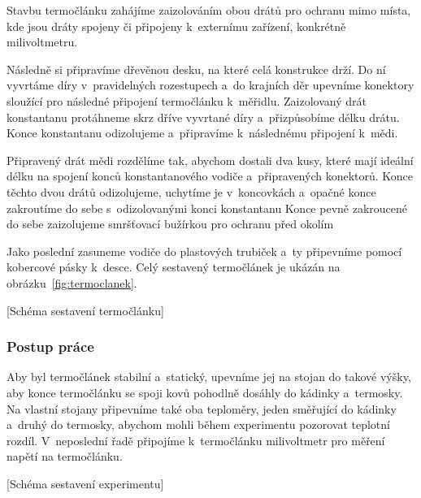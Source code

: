 Stavbu termočlánku zahájíme zaizolováním obou drátů pro ochranu mimo místa, kde
jsou dráty spojeny či připojeny k~externímu zařízení, konkrétně milivoltmetru.

Následně si připravíme dřevěnou desku, na které celá konstrukce drží.
Do ní vyvrtáme díry v~pravidelných rozestupech a~do krajních děr upevníme
konektory sloužící pro následné připojení termočlánku k~měřidlu. Zaizolovaný
drát konstantanu protáhneme skrz dříve vyvrtané díry a~přizpůsobíme
délku drátu. Konce konstantanu odizolujeme a~připravíme k~následnému
připojení k~mědi.

Připravený drát mědi rozdělíme tak, abychom dostali dva kusy, které mají
ideální délku na spojení konců konstantanového vodiče a~připravených konektorů.
Konce těchto dvou drátů odizolujeme, uchytíme je v~koncovkách a~opačné
konce zakroutíme do sebe s~odizolovanými konci konstantanu%
Konce pevně zakroucené do sebe zaizolujeme smršťovací bužírkou pro ochranu
před okolím

Jako poslední zasuneme vodiče do plastových trubiček a~ty připevníme pomocí
kobercové pásky k~desce. Celý sestavený termočlánek je ukázán na
obrázku~\ref{fig:termoclanek}.

[Schéma sestavení termočlánku]

\subsubsection{Postup práce}
Aby byl termočlánek stabilní a~statický, upevníme jej na stojan do takové
výšky, aby konce termočlánku se spoji kovů pohodlně dosáhly do kádinky
a~termosky. Na vlastní stojany připevníme také oba teploměry, jeden
směřující do kádinky a~druhý do termosky, abychom mohli během experimentu
pozorovat teplotní rozdíl. V~neposlední řadě připojíme k~termočlánku
milivoltmetr pro měření napětí na termočlánku. 

[Schéma sestavení experimentu]

